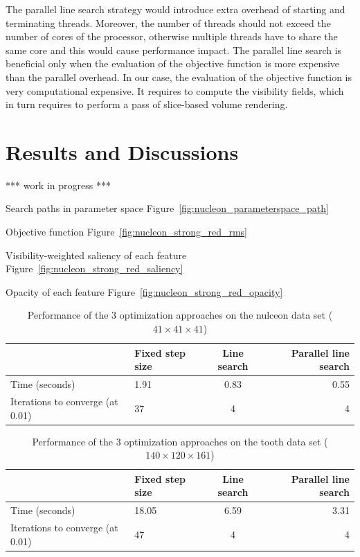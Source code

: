 The parallel line search strategy would introduce extra overhead of starting and terminating threads. Moreover, the number of threads should not exceed the number of cores of the processor, otherwise multiple threads have to share the same core and this would cause performance impact. The parallel line search is beneficial only when the evaluation of the objective function is more expensive than the parallel overhead.
In our case, the evaluation of the objective function is very computational expensive. It requires to compute the visibility fields, which in turn requires to perform a pass of slice-based volume rendering.

\section{Results and Discussions}

*** work in progress ***

Search paths in parameter space
Figure~\ref{fig:nucleon_parameterspace_path}

Objective function
Figure~\ref{fig:nucleon_strong_red_rms}

Visibility-weighted saliency of each feature
Figure~\ref{fig:nucleon_strong_red_saliency}

Opacity of each feature
Figure~\ref{fig:nucleon_strong_red_opacity}

\begin{table}[h]
\begin{tabular}{ l | l c r }
	& Fixed step size & Line search & Parallel line search \\
	\hline
	Time (seconds) & 1.91 & 0.83 & 0.55 \\
	Iterations to converge (at 0.01) & 37 & 4 & 4 \\
\end{tabular}
\caption[Table caption text]{Performance of the 3 optimization approaches on the nulceon data set ($ 41 \times 41 \times 41 $)}
\label{table:nucleon_table}
\end{table}

\begin{table}[h]
	\begin{tabular}{ l | l c r }
		& Fixed step size & Line search & Parallel line search \\
		\hline
		Time (seconds) & 18.05 & 6.59 & 3.31 \\
		Iterations to converge (at 0.01) & 47 & 4 & 4 \\
	\end{tabular}
	\caption[Table caption text]{Performance of the 3 optimization approaches on the tooth data set ($ 140 \times 120 \times 161 $)}
	\label{table:tooth_table}
\end{table}

